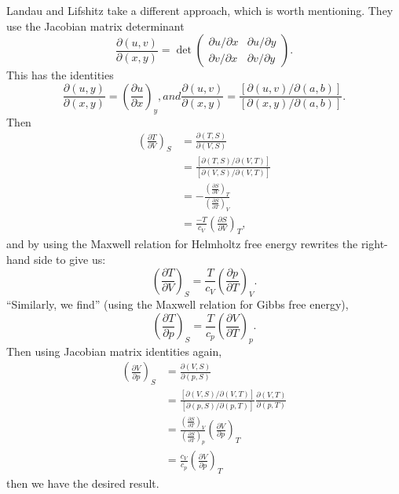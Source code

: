 \begin{remark}
Landau and Lifshitz take a different approach, which is worth
mentioning. They use the Jacobian matrix determinant
\begin{equation}
\frac{\partial(u,v)}{\partial(x,y)}=\det\begin{pmatrix}\partial
u/\partial x & \partial u/\partial y\\
\partial v/\partial x & \partial v/\partial y
\end{pmatrix}.
\end{equation}
This has the identities
\begin{subequations}
\begin{equation}
\frac{\partial(u,y)}{\partial(x,y)}=\left(\frac{\partial u}{\partial x}\right)_{y},
\end{equation}
and
\begin{equation}
\frac{\partial(u,v)}{\partial(x,y)}=\frac{[\partial(u,v)/\partial(a,b)]}{[\partial(x,y)/\partial(a,b)]}.
\end{equation}
\end{subequations}
Then
\begin{subequations}
  \begin{align}
\left(\frac{\partial T}{\partial V}\right)_{S}
&= \frac{\partial(T,S)}{\partial(V,S)}\\
&= \frac{[\partial(T,S)/\partial(V,T)]}{[\partial(V,S)/\partial(V,T)]}\\
&= -\frac{\left(\frac{\partial S}{\partial V}\right)_{T}}{\left(\frac{\partial S}{\partial T}\right)_{V}}\\
&= \frac{-T}{c_{V}}{\left(\frac{\partial S}{\partial V}\right)_{T}},
  \end{align}
\end{subequations}
and by using the Maxwell relation for Helmholtz free energy rewrites the
right-hand side to give us:
\begin{equation}
\left(\frac{\partial T}{\partial V}\right)_{S} = \frac{T}{c_{V}}\left(\frac{\partial p}{\partial T}\right)_{V}.
\end{equation}
``Similarly, we find'' (using the Maxwell relation for Gibbs free energy),
\begin{equation}
\left(\frac{\partial T}{\partial p}\right)_{S} = \frac{T}{c_{p}}\left(\frac{\partial V}{\partial T}\right)_{p}.
\end{equation}
Then using Jacobian matrix identities again,
\begin{subequations}
  \begin{align}
\left(\frac{\partial V}{\partial p}\right)_{S}
&= \frac{\partial(V,S)}{\partial(p,S)}\\
&= \frac{[\partial(V,S)/\partial(V,T)]}{[\partial(p,S)/\partial(p,T)]}\frac{\partial(V,T)}{\partial(p,T)}\\
&=\frac{\left(\frac{\partial S}{\partial T}\right)_{V}}{\left(\frac{\partial S}{\partial T}\right)_{p}}\left(\frac{\partial V}{\partial p}\right)_{T}\\
&=\frac{c_{V}}{c_{p}}\left(\frac{\partial V}{\partial p}\right)_{T}
  \end{align}
\end{subequations}
then we have the desired result.
\end{remark}


